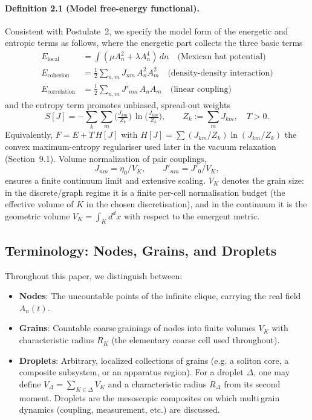\documentclass[11pt]{article}
\begin{document}
\paragraph{Definition 2.1 (Model free-energy functional).} Consistent with Postulate~2, we specify the model form of the energetic and entropic terms as follows,
where the energetic part collects the three basic terms
\begin{align}
E_{\text{local}} &= \int (\mu A_n^2 + \lambda A_n^4)\, dn \quad \text{(Mexican hat potential)}\\
E_{\text{cohesion}} &= \frac{1}{2} \sum_{n,m} J_{nm}\, A_n^2 A_m^2 \quad \text{(density-density interaction)}\\
E_{\text{correlation}} &= \frac{1}{2} \sum_{n,m} J'_{nm}\, A_n A_m \quad \text{(linear coupling)}
\end{align}
and the entropy term promotes unbiased, spread-out weights
\begin{equation}
S[J] = - \sum_{k}\sum_{m} \Big(\tfrac{J_{km}}{Z_k}\Big)\, \ln\Big(\tfrac{J_{km}}{Z_k}\Big),\qquad Z_k := \sum_m J_{km},\quad T>0.
\end{equation}
Equivalently, $F=E+T\,H[J]$ with $H[J]=\sum (J_{km}/Z_k)\ln(J_{km}/Z_k)$ the convex maximum-entropy regulariser used later in the vacuum relaxation (Section~9.1). Volume normalization of pair couplings,
\begin{equation}
J_{nm} = \eta_0/V_K,\qquad J'_{nm} = J'_0/V_K,
\end{equation}
ensures a finite continuum limit and extensive scaling. $V_K$ denotes the grain size: in the discrete/graph regime it is a finite per-cell normalisation budget (the effective volume of $K$ in the chosen discretisation), and in the continuum it is the geometric volume $V_K=\int_K d^d x$ with respect to the emergent metric.

\subsection{Terminology: Nodes, Grains, and Droplets}

Throughout this paper, we distinguish between:
\begin{itemize}
\item \textbf{Nodes}: The uncountable points of the infinite clique, carrying the real field $A_n(t)$.
\item \textbf{Grains}: Countable coarse\,grainings of nodes into finite volumes $V_K$ with characteristic radius $R_K$ (the elementary coarse cell used throughout).
\item \textbf{Droplets}: Arbitrary, localized collections of grains (e.g. a soliton core, a composite subsystem, or an apparatus region). For a droplet $\Delta$, one may define $V_\Delta = \sum_{K\in \Delta} V_K$ and a characteristic radius $R_\Delta$ from its second moment. Droplets are the mesoscopic composites on which multi\,grain dynamics (coupling, measurement, etc.) are discussed.
\end{itemize}
\end{document}
